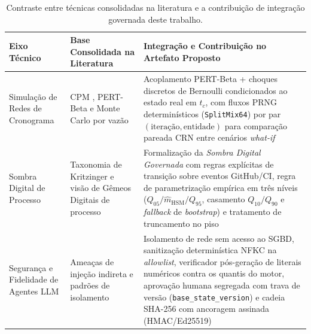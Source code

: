 \documentclass[12pt,openany,oneside,a4paper,english,brazilian,sumario=tradicional]{abntex2}
\newcommand{\fonteautores}{\par\vspace{1mm}{\small Fonte: Elaborado pelos autores (2026).}}
\begin{document}
\begin{table}[htbp]
\caption{Contraste entre técnicas consolidadas na literatura e a contribuição de integração governada deste trabalho.}\label{tab:contribuicao}
\footnotesize
\begin{tabularx}{\textwidth}{L{3.2cm} Y Y}
\toprule
\textbf{Eixo Técnico} & \textbf{Base Consolidada na Literatura} & \textbf{Integração e Contribuição no Artefato Proposto}\\
\midrule
Simulação de Redes de Cronograma & CPM \cite{kelley1959}, PERT-Beta \cite{maccrimmon1964,vose2008} e Monte Carlo por vazão \cite{vacanti2015} & Acoplamento PERT-Beta + choques discretos de Bernoulli condicionados ao estado real em $t_c$, com fluxos PRNG determinísticos (\texttt{SplitMix64}) por par $(\text{iteração},\text{entidade})$ para comparação pareada CRN entre cenários \textit{what-if}\\
Sombra Digital de Processo & Taxonomia de Kritzinger \cite{kritzinger2018} e visão de Gêmeos Digitais de processo \cite{guinea2024} & Formalização da \textit{Sombra Digital Governada} com regras explícitas de transição sobre eventos GitHub/CI, regra de parametrização empírica em três níveis ($Q_{05}/\hat{m}_{\mathrm{HSM}}/Q_{95}$, casamento $Q_{10}/Q_{90}$ e \textit{fallback} de \textit{bootstrap}) e tratamento de truncamento no piso\\
Segurança e Fidelidade de Agentes LLM & Ameaças de injeção indireta \cite{greshake2023,owasp2025} e padrões de isolamento \cite{debenedetti2025camel,beurerkellner2025patterns} & Isolamento de rede sem acesso ao SGBD, sanitização determinística NFKC na \textit{allowlist}, verificador pós-geração de literais numéricos contra os quantis do motor, aprovação humana segregada com trava de versão (\texttt{base\_state\_version}) e cadeia SHA-256 com ancoragem assinada (HMAC/Ed25519)\\
\bottomrule
\end{tabularx}
\fonteautores
\end{table}
\end{document}
